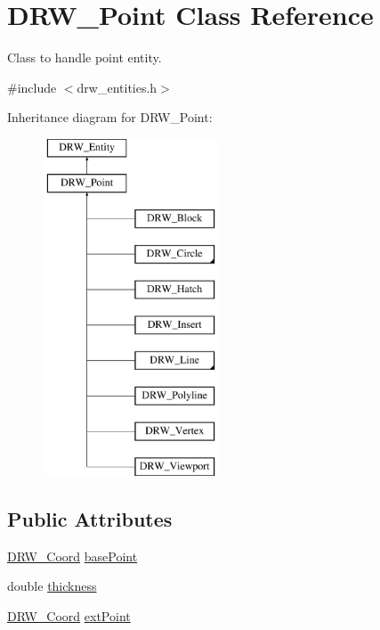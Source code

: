 \hypertarget{class_d_r_w___point}{}\section{D\+R\+W\+\_\+\+Point Class Reference}
\label{class_d_r_w___point}


Class to handle point entity.  




{\ttfamily \#include $<$drw\+\_\+entities.\+h$>$}

Inheritance diagram for D\+R\+W\+\_\+\+Point\+:\begin{figure}[H]
\begin{center}
\leavevmode
\includegraphics[height=10.000000cm]{d9/d53/class_d_r_w___point}
\end{center}
\end{figure}
\subsection*{Public Attributes}
\begin{DoxyCompactItemize}
\item 
\hyperlink{class_d_r_w___coord}{D\+R\+W\+\_\+\+Coord} \hyperlink{class_d_r_w___point_afaa15dc45c45d9057257e478c9746169}{base\+Point}
\item 
double \hyperlink{class_d_r_w___point_a909f6f2623e3b5cf40393636f3119954}{thickness}
\item 
\hyperlink{class_d_r_w___coord}{D\+R\+W\+\_\+\+Coord} \hyperlink{class_d_r_w___point_ab55e32170a648e8469844c886ff56fc7}{ext\+Point}
\end{DoxyCompactItemize}
